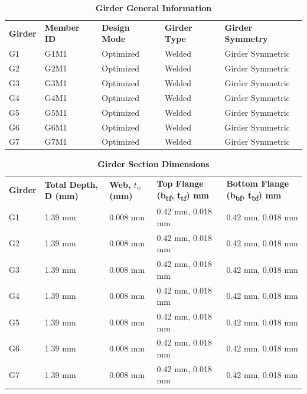 \documentclass[12pt,a4paper]{report}
\numberwithin{table}{chapter}
\numberwithin{figure}{chapter}
\begin{document}
\newpage

\vspace{0.4em}
\noindent
            
\vspace{4pt}
\begin{longtable}{|L{2.2cm}|L{1.8cm}|p{3.8cm}|p{3.8cm}|p{3.8cm}|}
\caption{\textbf{Girder General Information}} \\
\hline
\endfirsthead
\hline
\caption{\textbf{Girder General Information}} \\
\hline
\endhead
\textbf{Girder} & \textbf{Member ID} & \textbf{Design Mode} & \textbf{Girder Type} & \textbf{Girder Symmetry} \\[6pt]
\hline
G1 & G1M1 & Optimized & Welded & Girder Symmetric \\[8pt]
\hline
G2 & G2M1 & Optimized & Welded & Girder Symmetric \\[8pt]
\hline
G3 & G3M1 & Optimized & Welded & Girder Symmetric \\[8pt]
\hline
G4 & G4M1 & Optimized & Welded & Girder Symmetric \\[8pt]
\hline
G5 & G5M1 & Optimized & Welded & Girder Symmetric \\[8pt]
\hline
G6 & G6M1 & Optimized & Welded & Girder Symmetric \\[8pt]
\hline
G7 & G7M1 & Optimized & Welded & Girder Symmetric \\[8pt]
\hline
\end{longtable}

\vspace{0.6em}

\vspace{4pt}
\begin{longtable}{|L{1.8cm}|L{2.3cm}|L{1.8cm}|p{4.8cm}|p{4.8cm}|}
\caption{\textbf{Girder Section Dimensions}} \\
\hline
\endfirsthead
\hline
\caption{\textbf{Girder Section Dimensions}} \\
\hline
\endhead
\textbf{Girder} & \textbf{Total Depth, D (mm)} & \textbf{Web, $t_w$ (mm)} & \textbf{Top Flange (b\textsubscript{tf}, t\textsubscript{tf}) mm} & \textbf{Bottom Flange (b\textsubscript{bf}, t\textsubscript{bf}) mm} \\[6pt]
\hline
G1 & 1.39 mm & 0.008 mm & 0.42 mm, 0.018 mm & 0.42 mm, 0.018 mm \\[8pt]
\hline
G2 & 1.39 mm & 0.008 mm & 0.42 mm, 0.018 mm & 0.42 mm, 0.018 mm \\[8pt]
\hline
G3 & 1.39 mm & 0.008 mm & 0.42 mm, 0.018 mm & 0.42 mm, 0.018 mm \\[8pt]
\hline
G4 & 1.39 mm & 0.008 mm & 0.42 mm, 0.018 mm & 0.42 mm, 0.018 mm \\[8pt]
\hline
G5 & 1.39 mm & 0.008 mm & 0.42 mm, 0.018 mm & 0.42 mm, 0.018 mm \\[8pt]
\hline
G6 & 1.39 mm & 0.008 mm & 0.42 mm, 0.018 mm & 0.42 mm, 0.018 mm \\[8pt]
\hline
G7 & 1.39 mm & 0.008 mm & 0.42 mm, 0.018 mm & 0.42 mm, 0.018 mm \\[8pt]
\hline
\end{longtable}
\end{document}
